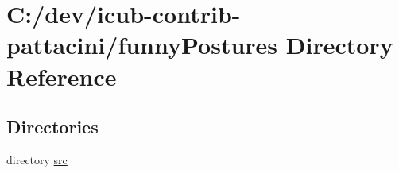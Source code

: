 \section{C\+:/dev/icub-\/contrib-\/pattacini/funny\+Postures Directory Reference}
\label{dir_4618040849a893aa2abf9a5cd90482df}
\subsection*{Directories}
\begin{DoxyCompactItemize}
\item 
directory \hyperlink{dir_3fc0bfd5dd5d4b135f0761eacfe8c49b}{src}
\end{DoxyCompactItemize}
